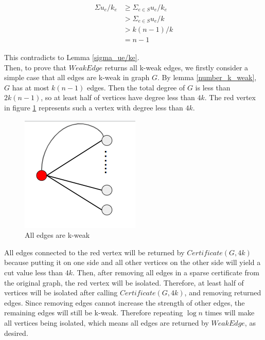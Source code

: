 \documentclass{article}
\begin{document}
\begin{align}
    \begin{aligned}
        \Sigma u_e/k_e &\geq \Sigma_{e \in S} u_e/k_e \\
                       & > \Sigma_{e \in S} u_e/k \\
                       & > k(n-1)/k \\
                       & = n - 1
    \end{aligned}
\end{align}

This contradicts to Lemma \ref{sigma_ue/ke}. \\

Then, to prove that $Weak Edge$ returns all k-weak edges, we firstly consider a simple case that all edges are k-weak in graph $G$. 
By lemma \ref{number_k_weak}, $G$ has at most $k(n-1)$ edges. Then the total degree of $G$ is less than $2k(n-1)$, so at least half of vertices have degree less than $4k$. The red vertex in figure \ref{fig:ex_all_weak} represents such a vertex with degree less than $4k$.


\begin{figure}[h!]
\centering
\includegraphics[scale=0.4]{images/all_weak_edge_example.png}
\caption{All edges are k-weak}
\label{fig:ex_all_weak}
\end{figure}

All edges connected to the red vertex will be returned by $Certificate(G, 4k)$ because putting it on one side and all other vertices on the other side will yield a cut value less than $4k$. Then, after removing all edges in a sparse certificate from the original graph, the red vertex will be isolated.
Therefore, at least half of vertices will be isolated after calling $Certificate(G, 4k)$, and removing returned edges. Since removing edges cannot increase the strength of other edges, the remaining edges will still be k-weak. Therefore repeating $\log n$ times will make all vertices being isolated, which means all edges are returned by $Weak Edge$, as desired. \\
\end{document}
